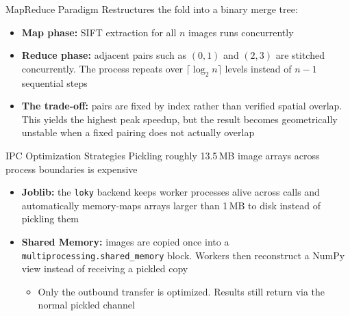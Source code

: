 \documentclass{beamer}
\begin{document}
\begin{frame}{MapReduce Paradigm}
  Restructures the fold into a binary merge tree:
  \begin{itemize}
    \item \textbf{Map phase:} SIFT extraction for all $n$ images runs concurrently
    \item \textbf{Reduce phase:} adjacent pairs such as $(0,1)$ and $(2,3)$ are stitched concurrently. The process repeats over $\lceil \log_2 n \rceil$ levels instead of $n-1$ sequential steps
    \item \textbf{The trade-off:} pairs are fixed by index rather than verified spatial overlap. This yields the highest peak speedup, but the result becomes geometrically unstable when a fixed pairing does not actually overlap
  \end{itemize}
\end{frame}

\begin{frame}{IPC Optimization Strategies}
  Pickling roughly 13.5\,MB image arrays across process boundaries is expensive
  \begin{itemize}
    \item \textbf{Joblib:} the \texttt{loky} backend keeps worker processes alive across calls and automatically memory-maps arrays larger than 1\,MB to disk instead of pickling them
    \item \textbf{Shared Memory:} images are copied once into a \texttt{multiprocessing.shared\_memory} block. Workers then reconstruct a NumPy view instead of receiving a pickled copy
      \begin{itemize}
        \item Only the outbound transfer is optimized. Results still return via the normal pickled channel
      \end{itemize}
  \end{itemize}
\end{frame}
\end{document}

